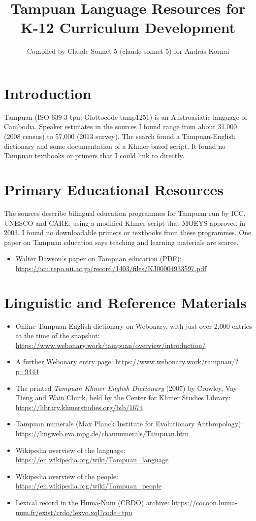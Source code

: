 \documentclass[12pt]{article}
\title{Tampuan Language Resources for K-12 Curriculum Development}
\author{Compiled by Claude Sonnet 5 (claude-sonnet-5) for Andr\'as Kornai}
\date{}
\begin{document}
\maketitle

\section{Introduction}
Tampuan (ISO 639-3 tpu; Glottocode tamp1251) is an Austroasiatic language of Cambodia. Speaker estimates in the sources I found range from about 31,000 (2008 census) to 57,000 (2013 survey). The search found a Tampuan-English dictionary and some documentation of a Khmer-based script. It found no Tampuan textbooks or primers that I could link to directly.

\section{Primary Educational Resources}
The sources describe bilingual education programmes for Tampuan run by ICC, UNESCO and CARE, using a modified Khmer script that MOEYS approved in 2003. I found no downloadable primers or textbooks from these programmes. One paper on Tampuan education says teaching and learning materials are scarce.
\begin{itemize}
\item Walter Dawson's paper on Tampuan education (PDF): \url{https://icu.repo.nii.ac.jp/record/1403/files/KJ00004933597.pdf}
\end{itemize}

\section{Linguistic and Reference Materials}
\begin{itemize}
\item Online Tampuan-English dictionary on Webonary, with just over 2,000 entries at the time of the snapshot: \url{https://www.webonary.work/tampuan/overview/introduction/}
\item A further Webonary entry page: \url{https://www.webonary.work/tampuan/?p=9444}
\item The printed \emph{Tampuan Khmer English Dictionary} (2007) by Crowley, Vay Tieng and Wain Churk, held by the Center for Khmer Studies Library: \url{https://library.khmerstudies.org/bib/1674}
\item Tampuan numerals (Max Planck Institute for Evolutionary Anthropology): \url{https://lingweb.eva.mpg.de/channumerals/Tampuan.htm}
\item Wikipedia overview of the language: \url{https://en.wikipedia.org/wiki/Tampuan_language}
\item Wikipedia overview of the people: \url{https://en.wikipedia.org/wiki/Tampuan_people}
\item Lexical record in the Huma-Num (CRDO) archive: \url{https://cocoon.huma-num.fr/exist/crdo/lexvo.xql?code=tpu}
\end{itemize}
\end{document}
